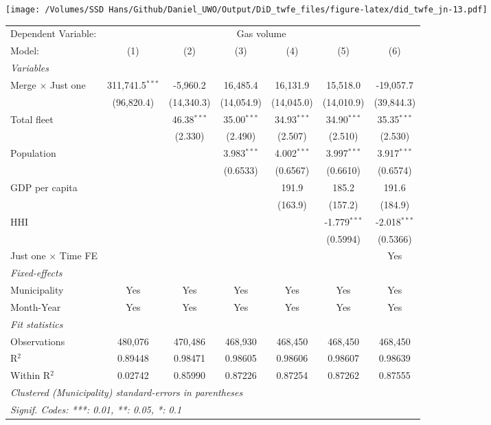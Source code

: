 \documentclass[
]{article}
\begin{document}
\texttt{[image: /Volumes/SSD Hans/Github/Daniel\_UWO/Output/DiD\_twfe\_files/figure-latex/did\_twfe\_jn-13.pdf]}

\begin{tabular}{lcccccc}
\tabularnewline\midrule\midrule
Dependent Variable:&\multicolumn{6}{c}{Gas volume}\\
Model:&(1) & (2) & (3) & (4) & (5) & (6)\\
\midrule \emph{Variables}&   &   &   &   &   &  \\
Merge $\times $ Just one & 311,741.5$^{***}$ & -5,960.2 & 16,485.4 & 16,131.9 & 15,518.0 & -19,057.7\\
  &(96,820.4) & (14,340.3) & (14,054.9) & (14,045.0) & (14,010.9) & (39,844.3)\\
Total fleet &    & 46.38$^{***}$ & 35.00$^{***}$ & 34.93$^{***}$ & 34.90$^{***}$ & 35.35$^{***}$\\
  &   & (2.330) & (2.490) & (2.507) & (2.510) & (2.530)\\
Population &    &    & 3.983$^{***}$ & 4.002$^{***}$ & 3.997$^{***}$ & 3.917$^{***}$\\
  &   &    & (0.6533) & (0.6567) & (0.6610) & (0.6574)\\
GDP per capita &    &    &    & 191.9 & 185.2 & 191.6\\
  &   &    &    & (163.9) & (157.2) & (184.9)\\
HHI &    &    &    &    & -1.779$^{***}$ & -2.018$^{***}$\\
  &   &    &    &    & (0.5994) & (0.5366)\\
Just one $\times$ Time FE &  &  &  &  &  & Yes\\
\midrule \emph{Fixed-effects}&   &   &   &   &   &  \\
Municipality & Yes & Yes & Yes & Yes & Yes & Yes\\
Month-Year & Yes & Yes & Yes & Yes & Yes & Yes\\
\midrule \emph{Fit statistics}&  & & & & & \\
Observations & 480,076&470,486&468,930&468,450&468,450&468,450\\
R$^2$ & 0.89448&0.98471&0.98605&0.98606&0.98607&0.98639\\
Within R$^2$ & 0.02742&0.85990&0.87226&0.87254&0.87262&0.87555\\
\midrule\midrule\multicolumn{7}{l}{\emph{Clustered (Municipality) standard-errors in parentheses}}\\
\multicolumn{7}{l}{\emph{Signif. Codes: ***: 0.01, **: 0.05, *: 0.1}}\\
\end{tabular}
\end{document}
